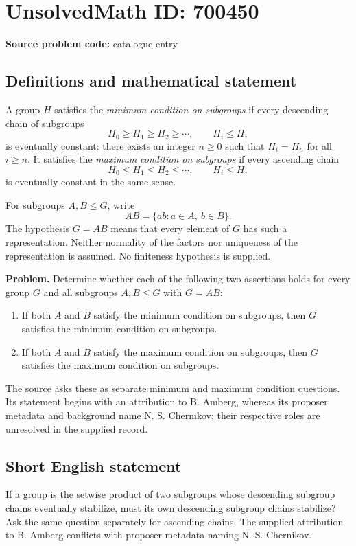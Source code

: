 \documentclass[11pt]{article}
\begin{document}
\section*{UnsolvedMath ID: 700450}
\textbf{Source problem code:} catalogue entry
\subsection{Definitions and mathematical statement}
A group \(H\) satisfies the \emph{minimum condition on subgroups} if every descending chain of subgroups
\[
H_0\ge H_1\ge H_2\ge\cdots,\qquad H_i\le H,
\]
is eventually constant: there exists an integer \(n\ge0\) such that \(H_i=H_n\) for all \(i\ge n\). It satisfies the \emph{maximum condition on subgroups} if every ascending chain
\[
H_0\le H_1\le H_2\le\cdots,\qquad H_i\le H,
\]
is eventually constant in the same sense.

For subgroups \(A,B\le G\), write
\[
AB=\{ab:a\in A,\ b\in B\}.
\]
The hypothesis \(G=AB\) means that every element of \(G\) has such a representation. Neither normality of the factors nor uniqueness of the representation is assumed. No finiteness hypothesis is supplied.

\textbf{Problem.} Determine whether each of the following two assertions holds for every group \(G\) and all subgroups \(A,B\le G\) with \(G=AB\):
\begin{enumerate}
\item If both \(A\) and \(B\) satisfy the minimum condition on subgroups, then \(G\) satisfies the minimum condition on subgroups.
\item If both \(A\) and \(B\) satisfy the maximum condition on subgroups, then \(G\) satisfies the maximum condition on subgroups.
\end{enumerate}
The source asks these as separate minimum and maximum condition questions. Its statement begins with an attribution to B. Amberg, whereas its proposer metadata and background name N. S. Chernikov; their respective roles are unresolved in the supplied record.
\subsection{Short English statement}
If a group is the setwise product of two subgroups whose descending subgroup chains eventually stabilize, must its own descending subgroup chains stabilize? Ask the same question separately for ascending chains. The supplied attribution to B. Amberg conflicts with proposer metadata naming N. S. Chernikov.
\end{document}
